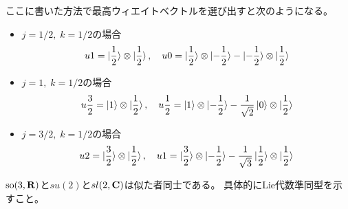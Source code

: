{	ここに書いた方法で最高ウィエイトベクトルを選び出すと次のようになる。
	\begin{itemize}\setlength{\itemsep}{-1mm} %
		\item $j=1/2,\;k=1/2$の場合
		\begin{equation*}\begin{split}
			u1 = \mathinner{|{\frac{1}{2}}\rangle}\otimes\mathinner{|{\frac{1}{2}}\rangle},\quad
			u0 = \mathinner{|{\frac{1}{2}}\rangle}\otimes\mathinner{|{-\frac{1}{2}}\rangle}
				- \mathinner{|{-\frac{1}{2}}\rangle}\otimes\mathinner{|{\frac{1}{2}}\rangle}
		\end{split}\end{equation*}
		\item $j=1,\;k=1/2$の場合
		\begin{equation*}\begin{split}
			u\frac{3}{2} = \mathinner{|{1}\rangle}\otimes\mathinner{|{\frac{1}{2}}\rangle},\quad
			u\frac{1}{2} = \mathinner{|{1}\rangle}\otimes\mathinner{|{-\frac{1}{2}}\rangle}
				- \frac{1}{\sqrt{2}}\mathinner{|{0}\rangle}\otimes\mathinner{|{\frac{1}{2}}\rangle}
		\end{split}\end{equation*}
		\item $j=3/2,\;k=1/2$の場合
		\begin{equation*}\begin{split}
			u2 = \mathinner{|{\frac{3}{2}}\rangle}\otimes\mathinner{|{\frac{1}{2}}\rangle},\quad
			u1 = \mathinner{|{\frac{3}{2}}\rangle}\otimes\mathinner{|{-\frac{1}{2}}\rangle}
				- \frac{1}{\sqrt{3}}\mathinner{|{\frac{1}{2}}\rangle}\otimes\mathinner{|{\frac{1}{2}}\rangle}
		\end{split}\end{equation*}
	\end{itemize} %
	\begin{note}[似た者同士]\label{note:似た者同士} %
		${\operatorname{so}}(3,\mathbf{R})$と$su(2)$と$sl(2,\mathbf{C})$は似た者同士である。
		具体的にLie代数準同型を示すこと。
	\end{note} %

}
